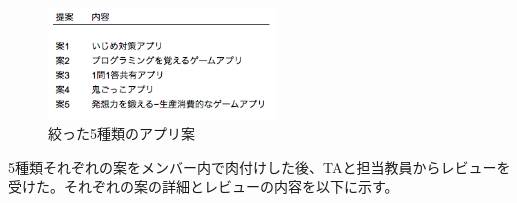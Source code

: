 \documentclass[openany,11pt,papersize]{jsbook}
\begin{document}
\begin{figure}[H]
\begin{center}
\includegraphics[width=6cm, bb=0 0 329 162]{img/AppIdea.png}
\end{center}
\caption{絞った5種類のアプリ案}
\end{figure}

\par 5種類それぞれの案をメンバー内で肉付けした後、TAと担当教員からレビューを受けた。それぞれの案の詳細とレビューの内容を以下に示す。
\end{document}
